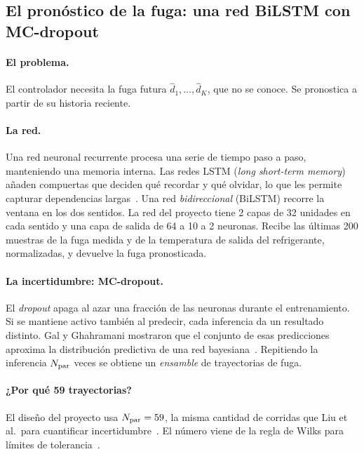 \subsection{El pronóstico de la fuga: una red BiLSTM con MC-dropout}
\paragraph{El problema.} El controlador necesita la fuga futura $\hat d_1,\dots,\hat d_K$, que no
se conoce. Se pronostica a partir de su historia reciente.

\paragraph{La red.} Una red neuronal recurrente procesa una serie de tiempo paso a paso,
manteniendo una memoria interna. Las redes LSTM (\emph{long short-term memory}) añaden
compuertas que deciden qué recordar y qué olvidar, lo que les permite capturar dependencias
largas~\cite{hochreiter1997}. Una red \emph{bidireccional} (BiLSTM) recorre la ventana en los
dos sentidos. La red del proyecto tiene 2 capas de 32 unidades en cada sentido y una capa de
salida de 64 a 10 a 2 neuronas. Recibe las últimas 200 muestras de la fuga medida y de la
temperatura de salida del refrigerante, normalizadas, y devuelve la fuga pronosticada.

\paragraph{La incertidumbre: MC-dropout.} El \emph{dropout} apaga al azar una fracción de las
neuronas durante el entrenamiento. Si se mantiene activo también al predecir, cada
inferencia da un resultado distinto. Gal y Ghahramani mostraron que el conjunto de esas
predicciones aproxima la distribución predictiva de una red bayesiana~\cite{gal2016}. Repitiendo
la inferencia $N_{\rm par}$ veces se obtiene un \emph{ensamble} de trayectorias de fuga.

\paragraph{¿Por qué 59 trayectorias?} El diseño del proyecto usa $N_{\rm par}=59$, la misma
cantidad de corridas que Liu et al.\ para cuantificar incertidumbre~\cite{liu2021}. El número
viene de la regla de Wilks para límites de tolerancia~\cite{wilks1941,glaeser2008}.

